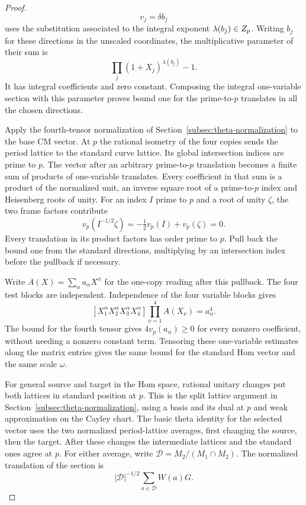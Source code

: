 \begin{proof}
\[
  v_j=\delta b_j
\]
 uses the substitution associated to
the integral exponent \(\lambda(b_j)\in Z_p\).
Writing \(b_j\) for these directions in the unscaled
coordinates, the multiplicative parameter of their sum is
\[
           \prod_j(1+X_j)^{\lambda(b_j)}-1 .
\]
It has integral coefficients and zero constant. Composing
the integral one-variable section with this parameter proves
bound one for the prime-to-\(p\) translates in all the
chosen directions.


Apply the fourth-tensor normalization of
Section~\ref{subsec:theta-normalization} to the
base CM vector. At \(p\) the rational isometry of the four
copies sends the period lattice to the standard curve
lattice. Its global intersection indices are prime to
\(p\). The vector after an arbitrary prime-to-\(p\)
translation becomes a finite sum of products of
one-variable translates. Every coefficient in that sum
is a product of the normalized unit, an inverse square
root of a prime-to-\(p\) index and Heisenberg roots of unity.
For an index \(I\) prime to \(p\) and a root of unity \(\zeta\), the two frame factors contribute
\[
  v_p(I^{-1/2}\zeta)=-\tfrac12v_p(I)+v_p(\zeta)=0 .
\]
Every translation in its product factors has order prime
to \(p\). Pull back the bound one from the standard
directions, multiplying by an intersection index
before the pullback if necessary.

Write \(A(X)=\sum_\alpha a_\alpha X^\alpha\) for the one-copy
reading after this pullback. The four test blocks are independent.
Independence of the four variable blocks gives
\[
  [X_1^\alpha X_2^\alpha X_3^\alpha X_4^\alpha]\prod_{\nu=1}^4 A(X_\nu)=a_\alpha^4.
\]
The bound for the fourth tensor gives \(4v_p(a_\alpha)\ge0\)
for every nonzero coefficient, without needing a nonzero
constant term. Tensoring these one-variable estimates along
the matrix entries gives the same bound for the standard Hom
vector and the same scale \(\omega\).


For general source and target in the Hom space,
rational unitary changes put both lattices in standard
position at \(p\). This is the split lattice argument
in Section~\ref{subsec:theta-normalization}, using a basis
and its dual at \(p\) and weak approximation on the Cayley
chart. The basic theta identity for the selected vector
uses the two normalized period-lattice averages,
first changing the source, then the target. After
these changes the intermediate lattices and the standard
ones agree at \(p\). For either average, write \(\mathcal D=M_2/(M_1\cap M_2)\).
The normalized translation of the section is
\[
      |\mathcal D|^{-1/2}\sum_{a\in\mathcal D}W(a)G .
\]


\end{proof}
